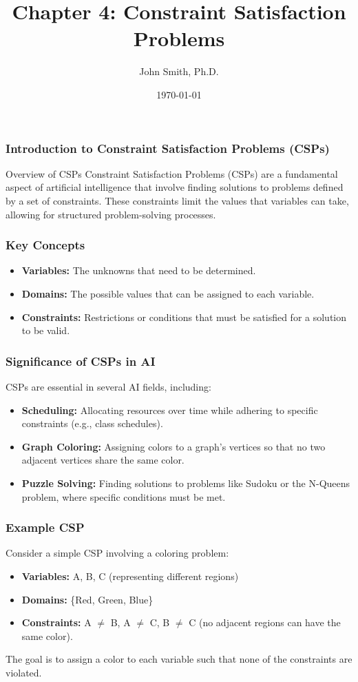 \documentclass[aspectratio=169]{beamer}
\title[Constraint Satisfaction Problems]{Chapter 4: Constraint Satisfaction Problems}
\author[J. Smith]{John Smith, Ph.D.}
\institute[University Name]{
  Department of Computer Science\\
  University Name\\
  \vspace{0.3cm}
  Email: email@university.edu\\
  Website: www.university.edu
}
\date{\today}
\begin{document}
\frame{\titlepage}

\begin{frame}[fragile]
    \frametitle{Introduction to Constraint Satisfaction Problems (CSPs)}
    \begin{block}{Overview of CSPs}
        Constraint Satisfaction Problems (CSPs) are a fundamental aspect of artificial intelligence that involve finding solutions to problems defined by a set of constraints. These constraints limit the values that variables can take, allowing for structured problem-solving processes.
    \end{block}
\end{frame}

\begin{frame}[fragile]
    \frametitle{Key Concepts}
    \begin{itemize}
        \item \textbf{Variables:} The unknowns that need to be determined.
        \item \textbf{Domains:} The possible values that can be assigned to each variable.
        \item \textbf{Constraints:} Restrictions or conditions that must be satisfied for a solution to be valid.
    \end{itemize}
\end{frame}

\begin{frame}[fragile]
    \frametitle{Significance of CSPs in AI}
    CSPs are essential in several AI fields, including:
    \begin{itemize}
        \item \textbf{Scheduling:} Allocating resources over time while adhering to specific constraints (e.g., class schedules).
        \item \textbf{Graph Coloring:} Assigning colors to a graph's vertices so that no two adjacent vertices share the same color.
        \item \textbf{Puzzle Solving:} Finding solutions to problems like Sudoku or the N-Queens problem, where specific conditions must be met.
    \end{itemize}
\end{frame}

\begin{frame}[fragile]
    \frametitle{Example CSP}
    Consider a simple CSP involving a coloring problem:
    \begin{itemize}
        \item \textbf{Variables:} A, B, C (representing different regions)
        \item \textbf{Domains:} \{Red, Green, Blue\}
        \item \textbf{Constraints:} A $\neq$ B, A $\neq$ C, B $\neq$ C (no adjacent regions can have the same color).
    \end{itemize}
    The goal is to assign a color to each variable such that none of the constraints are violated.
\end{frame}
\end{document}
